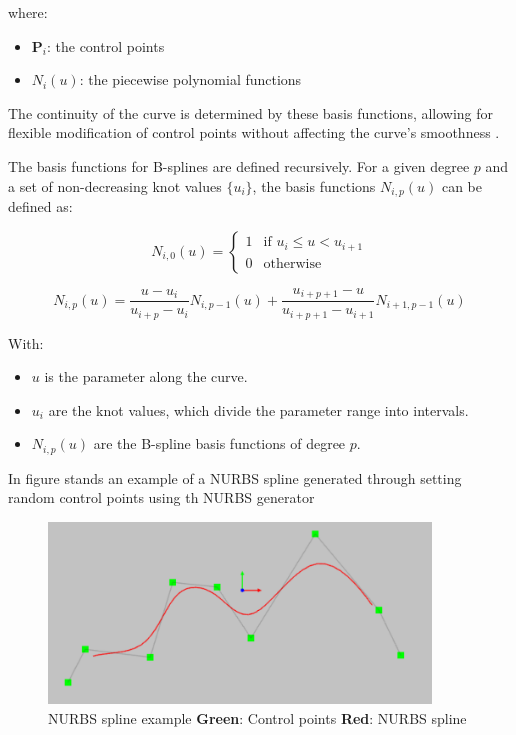 where:
\begin{itemize}
    \item \( \mathbf{P}_i \): the control points
    \item \( N_i(u) \): the piecewise polynomial functions
\end{itemize}
The continuity of the curve is determined by these basis functions, allowing for flexible modification of 
control points without affecting the curve's smoothness \cite{R29}.

The basis functions for B-splines are defined recursively. For a given degree \( p \) and a set of non-decreasing knot values 
\( \{ u_i \} \), the basis functions \( N_{i,p}(u) \) can be defined as:

\begin{equation}
    N_{i,0}(u) = 
\begin{cases} 
1 & \text{if } u_i \leq u < u_{i+1} \\
0 & \text{otherwise}
\end{cases}
\end{equation}

\begin{equation}
N_{i,p}(u) = \frac{u - u_i}{u_{i+p} - u_i} N_{i,p-1}(u) + \frac{u_{i+p+1} - u}{u_{i+p+1} - u_{i+1}} N_{i+1,p-1}(u)
\end{equation}


With:
\begin{itemize}
    \item \( u \) is the parameter along the curve.
    \item \( u_i \) are the knot values, which divide the parameter range into intervals.
    \item \( N_{i,p}(u) \) are the B-spline basis functions of degree \( p \).
\end{itemize}

In figure  stands an example of a NURBS spline generated through setting random 
control points using th NURBS generator \cite{R32}

\begin{figure}[H]
    \centering
    \includegraphics[width=4in]{images/Chap1/control-spline.png}
    \caption{NURBS spline example
    \newline \textbf{Green}: Control points
    \newline \textbf{Red}: NURBS spline}
    \label{NURBS} 
\end{figure}

